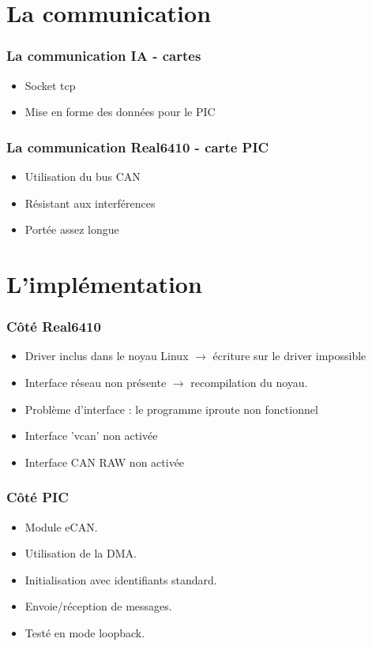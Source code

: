 \documentclass{beamer}
\begin{document}
\section{La communication}

\begin{frame}
\frametitle{La communication IA - cartes}
\begin{itemize}
  \item Socket tcp
  \item Mise en forme des données pour le PIC
\end{itemize}

\end{frame}
\begin{frame}
\frametitle{La communication Real6410 - carte PIC}
\begin{itemize}
  \item Utilisation du bus CAN
  \item Résistant aux interférences
  \item Portée assez longue
\end{itemize}

\end{frame}
\section{L'implémentation}

\begin{frame}
\frametitle{Côté Real6410}
\begin{itemize}
  \item Driver inclus dans le noyau Linux $\rightarrow$ écriture sur le driver impossible
  \item Interface réseau non présente $\rightarrow$ recompilation du noyau.
  \item Problème d'interface : le programme iproute non fonctionnel
  \item Interface 'vcan' non activée
  \item Interface CAN RAW non activée
\end{itemize}
\end{frame}
\begin{frame}
\frametitle{Côté PIC}
\begin{itemize}
  \item Module eCAN.
  \item Utilisation de la DMA.
  \item Initialisation avec identifiants standard.
  \item Envoie/réception de messages.
  \item Testé en mode loopback.
\end{itemize}

\end{frame}
\end{document}
